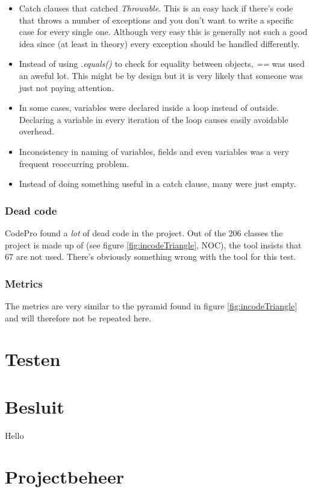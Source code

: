 \documentclass[pdftex12pt, a4paper]{article}
\begin{document}
\begin{itemize}
\item Catch clauses that catched \emph{Throwable}.
This is an easy hack if there's code that throws a number of exceptions and you don't want to write a specific case for every single one.
Although very easy this is generally not such a good idea since (at least in theory) every exception should be handled differently.
\item Instead of using \emph{.equals()} to check for equality between objects, \emph{==} was used an aweful lot.
This might be by design but it is very likely that someone was just not paying attention.
\item In some cases, variables were declared inside a loop instead of outside.
Declaring a variable in every iteration of the loop causes easily avoidable overhead.
\item Inconsistency in naming of variables, fields and even variables was a very frequent reoccurring problem.
\item Instead of doing something useful in a catch clause, many were just empty.
\end{itemize}

\subsubsection{Dead code}

CodePro found a \emph{lot} of dead code in the project.
Out of the 206 classes the project is made up of (see figure \ref{fig:incodeTriangle}, NOC), the tool insists that 67 are not used.
There's obviously something wrong with the tool for this test.

\subsubsection{Metrics}

The metrics are very similar to the pyramid found in figure \ref{fig:incodeTriangle} and will therefore not be repeated here.


\newpage

\section{Testen}

\newpage

\section{Besluit}

Hello 


\newpage

\section{Projectbeheer}
\end{document}
